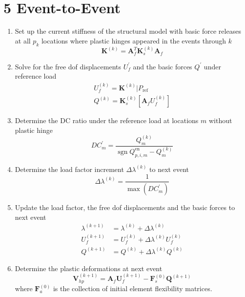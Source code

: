 \hypertarget{event-to-event}{%
\section{5 Event-to-Event}\label{event-to-event}}

\begin{enumerate}
\def\labelenumi{\arabic{enumi})}
\item
  Set up the current stiffness of the structural model with basic force
  releases at all \(p_{k}\) locations where plastic hinges appeared in
  the events through \(k\) \[
   \mathbf{K}^{(k)}=\mathbf{A}_{f}^{T} \mathbf{K}_{s}^{(k)} \mathbf{A}_{f}
   \]
\item
  Solve for the free dof displacements \(U_{f}^{\prime}\) and the basic
  forces \(Q^{\prime}\) under reference load \[
   \begin{array}{l}
   U_{f}^{(k)}=\mathbf{K}^{(k)} | P_{\text {ref}} \\
   Q^{(k)}=\mathbf{K}_{s}^{(k)}\left[\mathbf{A}_{f} U_{f}^{(k)}\right]
   \end{array}
   \]
\item
  Determine the DC ratio under the reference load at locations \(m\)
  without plastic hinge \[
   D C_{m}^{\prime}=\frac{Q_{m}^{(k)}}{\operatorname{sgn} Q_{p, i, m}^{\operatorname{en}}-Q_{m}^{(k)}}
   \]
\item
  Determine the load factor increment \(\Delta \lambda^{(k)}\) to next
  event \[
   \Delta \lambda^{(k)}=\frac{1}{\max \left(D C_{m}^{\prime}\right)}
   \]
\item
  Update the load factor, the free dof displacements and the basic
  forces to next event \[
   \begin{aligned}
   \lambda^{(k+1)} &=\lambda^{(k)}+\Delta \lambda^{(k)} \\
   U_{f}^{(k+1)} &=U_{f}^{(k)}+\Delta \lambda^{(k)} U_{f}^{(k)} \\
   Q^{(k+1)} &=Q^{(k)}+\Delta \lambda^{(k)} Q^{(k)}
   \end{aligned}
   \]
\item
  Determine the plastic deformations at next event \[
   \boldsymbol{V}_{h p}^{(k+1)}=\mathbf{A}_{f} \boldsymbol{U}_{f}^{(k+1)}-\mathbf{F}_{s}^{(0)} \boldsymbol{Q}^{(k+1)}
   \] where \(\mathbf{F}_{a}^{(0)}\) is the collection of initial
  element flexibility matrices.
\end{enumerate}
